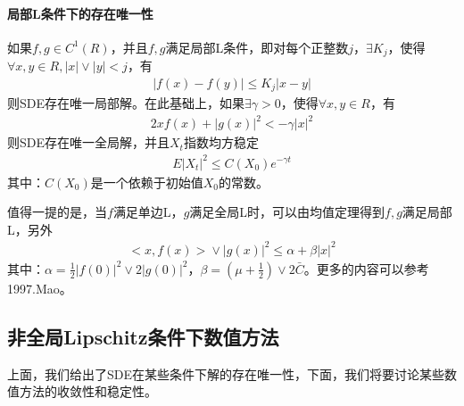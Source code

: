             \paragraph{局部L条件下的存在唯一性}如果$f,g\in C^1(R)$，并且$f,g$满足局部L条件，即对每个正整数$j$，$\exists K_j$，使得$\forall x,y \in R,|x|\vee |y|<j$，有
            \begin{align*}
                |f(x) - f(y) | \leqslant K_j |x-y|
            \end{align*}
            则SDE存在唯一局部解。在此基础上，如果$\exists \gamma >0$，使得$\forall x,y\in R$，有
            \begin{align*}
                2xf(x)+|g(x)|^2 < -\gamma|x|^2
            \end{align*}
            则SDE存在唯一全局解，并且$X_t$指数均方稳定
            \begin{align*}
            E|X_t|^2 \leqslant C(X_0) e^{-\gamma t}
            \end{align*}
            其中：$C(X_0)$是一个依赖于初始值$X_0$的常数。
            \par
            值得一提的是，当$f$满足单边L，$g$满足全局L时，可以由均值定理得到$f,g$满足局部L，另外
            \begin{align*}
            \bigl<x,f(x)\bigr> \vee |g(x)|^2 \leqslant\alpha + \beta|x|^2
            \end{align*}
            其中：$\alpha = \frac 12 |f(0)|^2 \vee 2|g(0)|^2$，$\beta = (\mu+\frac 12)\vee 2\bar{C}$。更多的内容可以参考1997.Mao\cite{1997.Mao}。
    \subsection{非全局Lipschitz条件下数值方法}
        \par
        上面，我们给出了SDE在某些条件下解的存在唯一性，下面，我们将要讨论某些数值方法的收敛性和稳定性。
